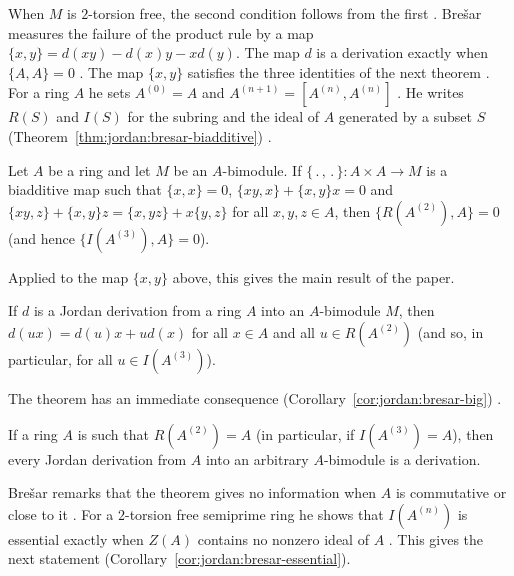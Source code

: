When $M$ is $2$-torsion free, the second condition follows from the first
\cite[p.~414]{Bresar2005}. Brešar measures the failure of the product rule by a map
$\{x,y\}=d(xy)-d(x)y-xd(y)$. The map $d$ is a derivation exactly when $\{A,A\}=0$
\cite[p.~414]{Bresar2005}. The map $\{x,y\}$ satisfies the three identities of the next
theorem \cite[p.~414]{Bresar2005}. For a ring $A$ he sets $A^{(0)}=A$ and
$A^{(n+1)}=[A^{(n)},A^{(n)}]$ \cite[p.~412]{Bresar2005}. He writes $R(S)$ and $I(S)$ for the
subring and the ideal of $A$ generated by a subset $S$ (Theorem~\ref{thm:jordan:bresar-biadditive}) \cite[p.~412]{Bresar2005}.

\begin{theorem}\label{thm:jordan:bresar-biadditive}
Let $A$ be a ring and let $M$ be an $A$-bimodule. If $\{\,.\,,\,.\,\}\colon A\times A\to M$
is a biadditive map such that $\{x,x\}=0$, $\{xy,x\}+\{x,y\}x=0$ and
$\{xy,z\}+\{x,y\}z=\{x,yz\}+x\{y,z\}$ for all $x,y,z\in A$, then
$\{R(A^{(2)}),A\}=0$ (and hence $\{I(A^{(3)}),A\}=0$).
\end{theorem}

Applied to the map $\{x,y\}$ above, this gives the main result of the paper.

\begin{theorem}\label{thm:jordan:bresar-restriction}
If $d$ is a Jordan derivation from a ring $A$ into an $A$-bimodule $M$, then
$d(ux)=d(u)x+ud(x)$ for all $x\in A$ and all $u\in R(A^{(2)})$ (and so, in particular,
for all $u\in I(A^{(3)})$).
\end{theorem}

The theorem has an immediate consequence (Corollary~\ref{cor:jordan:bresar-big}) \cite[p.~414]{Bresar2005}.

\begin{corollary}\label{cor:jordan:bresar-big}
If a ring $A$ is such that $R(A^{(2)})=A$ (in particular, if $I(A^{(3)})=A$), then every
Jordan derivation from $A$ into an arbitrary $A$-bimodule is a derivation.
\end{corollary}

Brešar remarks that the theorem gives no information when $A$ is commutative or close
to it \cite[p.~411]{Bresar2005}. For a $2$-torsion free semiprime ring he shows that
$I(A^{(n)})$ is essential exactly when $Z(A)$ contains no nonzero ideal of $A$
\cite[Lemma~3.7, p.~416]{Bresar2005}. This gives the next statement (Corollary~\ref{cor:jordan:bresar-essential}).

